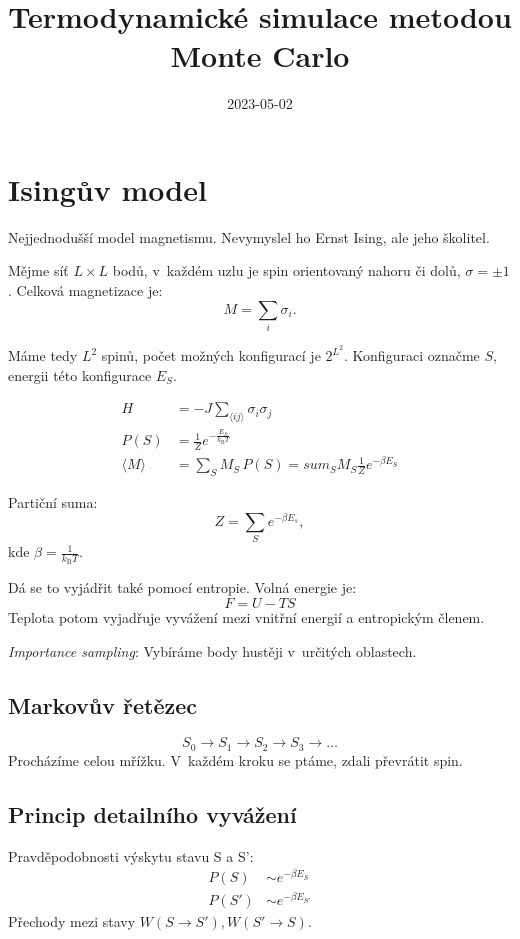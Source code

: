 \documentclass[a4paper]{article}
\title{Termodynamické simulace metodou Monte Carlo}
\date{2023-05-02}
\newcommand\boltzmann{k_\mathrm{B}}
\begin{document}
\section{Isingův model}
Nejjednodušší model magnetismu.
Nevymyslel ho Ernst Ising, ale jeho školitel.

Mějme síť $L \times L$ bodů, v~každém uzlu je spin
orientovaný nahoru či dolů, $\sigma = \pm 1$.
Celková magnetizace je:
\begin{equation}
    M = \sum_i \sigma_i.
\end{equation}

Máme tedy $L^2$ spinů, počet možných konfigurací je $2^{L^2}$.
Konfiguraci označme $S$, energii této konfigurace $E_S$.

\begin{align}
    H &= -J \sum_{\langle i j \rangle} \sigma_i \sigma_j
    \\
    P(S) &= \frac{1}{Z} e^{-\frac{E_S}{\boltzmann T}}
    \\
    \langle M \rangle &= \sum_S M_S \, P(S)
        = sum_S M_S \frac{1}{Z} e^{-\beta E_S}
\end{align}

Partiční suma:
\begin{equation}
    Z = \sum_S e^{-\beta E_s},
\end{equation}
kde $\beta = \frac{1}{\boltzmann T}$.

Dá se to vyjádřit také pomocí entropie. Volná energie je:
\begin{equation}
    F = U - TS
\end{equation}
Teplota potom vyjadřuje vyvážení mezi vnitřní energií a entropickým členem.

\emph{Importance sampling}: Vybíráme body hustěji v~určitých oblastech.

\subsection{Markovův řetězec}
\begin{equation}
    S_0 \rightarrow S_1 \rightarrow S_2 \rightarrow S_3 \rightarrow \dots
\end{equation}
Procházíme celou mřížku. V~každém kroku se ptáme, zdali převrátit spin.

\subsection{Princip detailního vyvážení}
Pravděpodobnosti výskytu stavu S a S':
\begin{align}
    P(S) &\sim e^{-\beta E_S}
    \\
    P(S') &\sim e^{-\beta E_{S'}}
\end{align}
Přechody mezi stavy $W(S \rightarrow S'), W(S' \rightarrow S)$.
\end{document}
